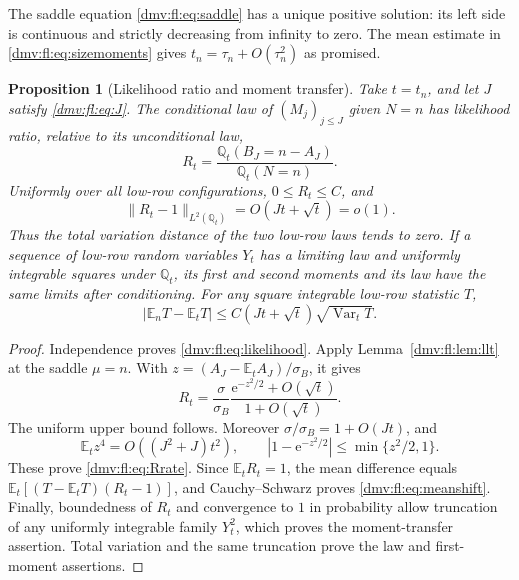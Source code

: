 \documentclass[11pt,letterpaper]{article}
\numberwithin{equation}{section}
\newtheorem{proposition}[theorem]{Proposition}
\theoremstyle{definition}\newtheorem{definition}[theorem]{Definition}
\theoremstyle{remark}\newtheorem{remark}[theorem]{Remark}
\newcommand{\E}{\mathbb E}
\newcommand{\ee}{\mathrm e}
\newcommand{\Q}{\mathbb Q}
\DeclareMathOperator{\Var}{Var}
\begin{document}
The saddle equation \eqref{dmv:fl:eq:saddle} has a unique positive solution:
its left side is continuous and strictly decreasing from infinity to
zero. The mean estimate in \eqref{dmv:fl:eq:sizemoments} gives
$t_n=\tau_n+O(\tau_n^2)$ as promised.

\begin{proposition}[Likelihood ratio and moment transfer]\label{dmv:fl:prop:transfer}
Take $t=t_n$, and let $J$ satisfy \eqref{dmv:fl:eq:J}. The conditional law of
$(M_j)_{j\le J}$ given $N=n$ has likelihood ratio, relative to its
unconditional law,
\begin{equation}\label{dmv:fl:eq:likelihood}
 R_t=\frac{\Q_t(B_J=n-A_J)}{\Q_t(N=n)}.
\end{equation}
Uniformly over all low-row configurations, $0\le R_t\le C$, and
\begin{equation}\label{dmv:fl:eq:Rrate}
 \|R_t-1\|_{L^2(\Q_t)}=O(Jt+\sqrt t)=o(1).
\end{equation}
Thus the total variation distance of the two low-row laws tends to zero.
If a sequence of low-row random variables $Y_t$ has a limiting law and
uniformly integrable squares under $\Q_t$, its first and second moments
and its law have the same limits after conditioning. For any square
integrable low-row statistic $T$,
\begin{equation}\label{dmv:fl:eq:meanshift}
 |\E_nT-\E_tT|
 \le C(Jt+\sqrt t)\sqrt{\Var_tT}.
\end{equation}
\end{proposition}
\begin{proof}
Independence proves \eqref{dmv:fl:eq:likelihood}. Apply Lemma~\ref{dmv:fl:lem:llt}
at the saddle $\mu=n$. With
$z=(A_J-\E_tA_J)/\sigma_B$, it gives
\[
 R_t=\frac{\sigma}{\sigma_B}
       \frac{\ee^{-z^2/2}+O(\sqrt t)}{1+O(\sqrt t)}.
\]
The uniform upper bound follows. Moreover
$\sigma/\sigma_B=1+O(Jt)$, and
\[
 \E_tz^4=O((J^2+J)t^2),\qquad
 |1-\ee^{-z^2/2}|\le\min\{z^2/2,1\}.
\]
These prove \eqref{dmv:fl:eq:Rrate}. Since $\E_tR_t=1$, the mean difference
equals $\E_t[(T-\E_tT)(R_t-1)]$, and Cauchy--Schwarz proves
\eqref{dmv:fl:eq:meanshift}. Finally, boundedness of $R_t$ and convergence to
$1$ in probability allow truncation of any uniformly integrable family
$Y_t^2$, which proves the moment-transfer assertion. Total variation
and the same truncation prove the law and first-moment assertions.
\end{proof}
\end{document}

